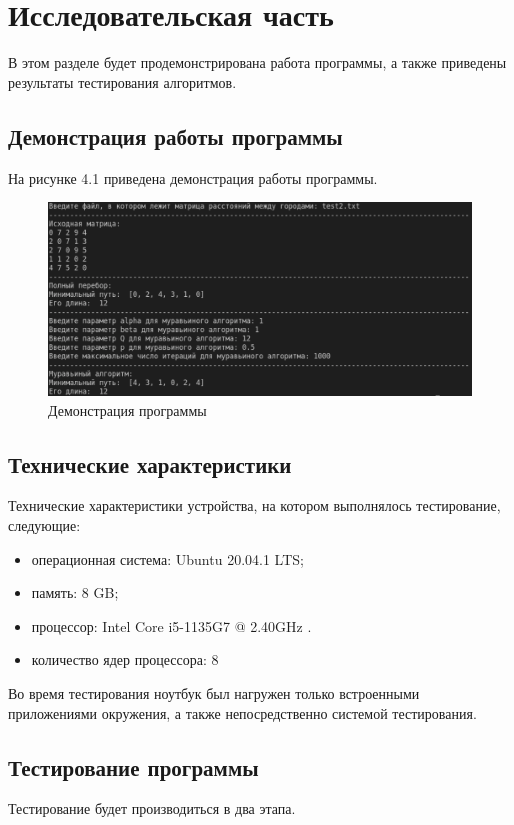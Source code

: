 \chapter{Исследовательская часть}
В этом разделе будет продемонстрирована работа программы, а также
приведены результаты тестирования алгоритмов.

\section{Демонстрация работы программы}
На рисунке 4.1 приведена демонстрация работы программы.

\FloatBarrier
\begin{figure}[h]
	\begin{center}
		\includegraphics[]{inc/demonstrate.png}
	\end{center}
	\caption{Демонстрация программы}
\end{figure}
\FloatBarrier


\section{Технические характеристики}
Технические характеристики устройства, на котором выполнялось тестирование, следующие:
\begin{itemize}
	\item операционная система: Ubuntu 20.04.1 LTS;
	\item память: 8 GB;
	\item процессор: Intel Core i5-1135G7 @ 2.40GHz \cite{intel}.
	\item количество ядер процессора: 8
\end{itemize}

Во время тестирования ноутбук был нагружен только встроенными приложениями окружения, а также непосредственно системой тестирования.

\section{Тестирование программы}
Тестирование будет производиться в два этапа.

